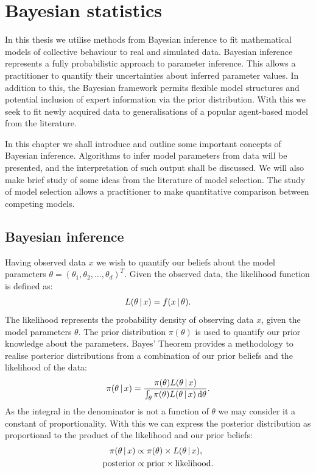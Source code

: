 \graphicspath{{fig/bayes_intro/}}

\chapter{Bayesian statistics}
\label{cha:bayes_intro}

In this thesis we utilise methods from Bayesian inference to fit mathematical
models of collective behaviour to real and simulated data. Bayesian inference
represents a fully probabilistic approach to parameter inference. This allows a
practitioner to quantify their uncertainties about inferred parameter values.
In addition to this, the Bayesian framework permits flexible model structures
and potential inclusion of expert information via the prior distribution. With
this we seek to fit newly acquired data to generalisations of a popular
agent-based model from the literature.

In this chapter we shall introduce and outline some important concepts of
Bayesian inference. Algorithms to infer model parameters from data will be
presented, and the interpretation of such output shall be discussed. We will
also make brief study of some ideas from the literature of model selection. The
study of model selection allows a practitioner to make quantitative
comparison between competing models.

\section{Bayesian inference}
\label{sec:bayesian_inference}

Having observed data $x$ we wish to quantify our beliefs about the model
parameters $\theta = (\theta_1,\theta_2,\dots,\theta_d)^T$. Given the observed
data, the likelihood function is defined as:
\begin{equation}
  L(\theta \,|\, x) = f(x \,|\,\theta).
\end{equation}
The likelihood represents the probability density of observing data $x$, given
the model parameters $\theta$. The prior distribution $\pi(\theta)$ is used to
quantify our prior knowledge about the parameters. Bayes' Theorem provides a
methodology to realise posterior distributions from a combination of our prior
beliefs and the likelihood of the data:
\begin{equation}
  \label{eq:bayes_theorem}
  \pi(\theta \given x) =
    \frac{\pi(\theta) L(\theta\given x)}%
         {\int_{\theta} \pi(\theta) L(\theta\given x) \, \textup{d}\theta}.
\end{equation}
As the integral in the denominator is not a function of $\theta$ we may
consider it a constant of proportionality. With this we can express the
posterior distribution as proportional to the product of the likelihood and our
prior beliefs:
\begin{align*}
  \pi(\theta\,|\, x) & \propto \pi(\theta) \times L(\theta\,|\, x), \\
  \text{posterior}    & \propto \text{prior} \times \text{likelihood}.
\end{align*}

